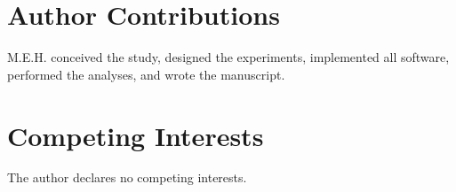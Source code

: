 \documentclass[11pt,a4paper]{article}
\begin{document}
\section*{Author Contributions}
M.E.H. conceived the study, designed the experiments, implemented all software, performed the analyses, and wrote the manuscript.

\section*{Competing Interests}
The author declares no competing interests.
\end{document}
